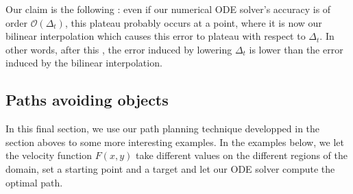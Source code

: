 \documentclass[11pt]{article}
\theoremstyle{definition}
\theoremstyle{remark}
\begin{document}
\FloatBarrier

\noindent Our claim is the following : even if our numerical ODE solver's accuracy is of order $\mathcal{O}(\Delta_t)$, this plateau probably occurs at a point, where it is now our bilinear interpolation which causes this error to plateau with respect to $\Delta_t$. In other words, after this , the error induced by lowering $\Delta_t$ is lower than the error induced by the bilinear interpolation.

\subsection{Paths avoiding objects}
In this final section, we use our path planning technique developped in the section aboves to some more interesting examples. In the examples below, we let the velocity function $F(x,y)$ take different values on the different regions of the domain, set a starting point and a target and let our ODE solver compute the optimal path.
\end{document}
